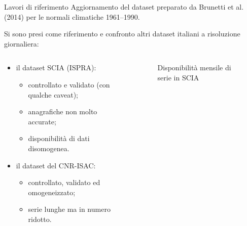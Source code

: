 \begin{frame}{Lavori di riferimento}
  Aggiornamento del dataset preparato da Brunetti et al. (2014) per le normali climatiche 1961--1990.

  Si sono presi come riferimento e confronto altri dataset italiani a risoluzione giornaliera:
  \begin{columns}
    \begin{column}{0.5\textwidth}
      \begin{itemize}
        \item il dataset SCIA (ISPRA):
          \begin{itemize}
            \item controllato e validato (con qualche caveat);
            \item anagrafiche non molto accurate;
            \item disponibilità di dati disomogenea.
          \end{itemize}
        \item il dataset del CNR-ISAC:
          \begin{itemize}
            \item controllato, validato ed omogeneizzato;
            \item serie lunghe ma in numero ridotto.
          \end{itemize}
      \end{itemize}
    \end{column}
    \begin{column}{0.5\textwidth}
      \begin{figure}
        
        \caption{Disponibilità mensile di serie in SCIA}
      \end{figure}
    \end{column}
  \end{columns}
\end{frame}